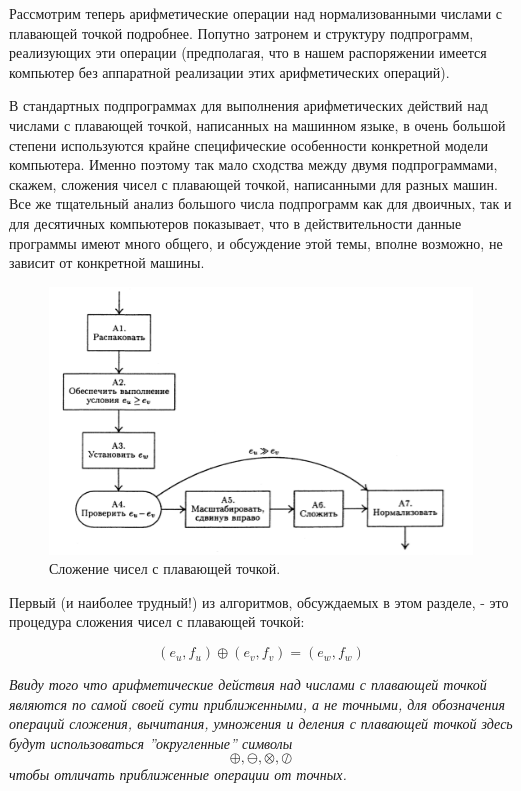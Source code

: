 Рассмотрим теперь арифметические операции над нормализованными числами с плавающей точкой подробнее. Попутно затронем и структуру подпрограмм, реализующих эти операции (предполагая, что в нашем распоряжении имеется компьютер без аппаратной реализации этих арифметических операций).

В стандартных подпрограммах для выполнения арифметических действий над числами с плавающей точкой, написанных на машинном языке, в очень большой степени используются крайне специфические особенности конкретной модели компьютера. Именно поэтому так мало сходства между двумя подпрограммами, скажем, сложения чисел с плавающей точкой, написанными для разных машин. Все же тщательный анализ большого числа подпрограмм как для двоичных, так и для десятичных компьютеров показывает, что в действительности данные программы имеют много общего, и обсуждение этой темы, вполне возможно, не зависит от конкретной машины. 

\begin{figure}

\begin{center}
\includegraphics[scale=.9]{s}
\end{center}
\caption{Сложение чисел с плавающей точкой.}
\end{figure}


Первый (и наиболее трудный!) из алгоритмов, обсуждаемых в этом разделе, - это процедура сложения чисел с плавающей точкой:

\begin{equation}
(e_u,f_u) \oplus (e_v,f_v) = (e_w, f_w)
\end{equation}

\textit{Ввиду того что арифметические действия над числами с плавающей точкой являются по самой своей сути приближенными, а не точными, для обозначения операций сложения, вычитания, умножения и деления с плавающей точкой здесь будут использоваться ''округленные'' символы}
$$ \oplus, \ominus, \otimes, \oslash $$
\textit{чтобы отличать приближенные операции от точных.}

